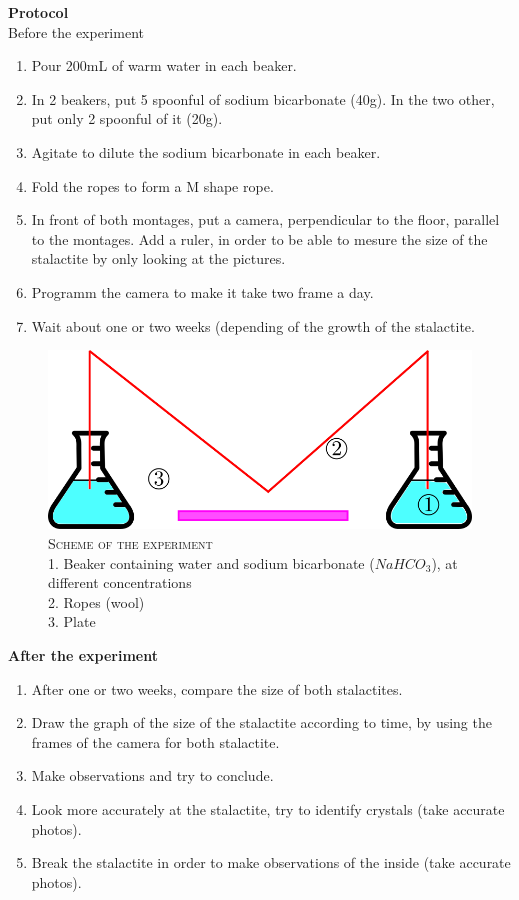 \documentclass[draft, final]{report}
\begin{document}
\textbf{Protocol} \\
Before the experiment
    \begin{enumerate}
      \item Pour 200mL of warm water in each beaker.
      \item In 2 beakers, put 5 spoonful of sodium bicarbonate (40g). In the two other, put only 2 spoonful of it (20g).
      \item Agitate to dilute the sodium bicarbonate in each beaker.
      \item Fold the ropes to form a M shape rope.
      \item In front of both montages, put a camera, perpendicular to the floor, parallel to the montages. Add a ruler, in order to be able to mesure the size of the stalactite by only looking at the pictures.
      \item Programm the camera to make it take two frame a day.
      \item Wait about one or two weeks (depending of the growth of the stalactite.
    \end{enumerate}

    \begin{figure}[!ht]
      \centering
      \includegraphics[scale=0.3]{LateX/Images/schemeexperiment.png}
      \caption{ \textsc{Scheme of the experiment}\\
                1. Beaker containing water and sodium bicarbonate ($NaHCO_3$), at different concentrations\\
                2. Ropes (wool)\\
                3. Plate\\}
    \end{figure}
\break
\textbf{After the experiment}
\begin{enumerate}
  \item After one or two weeks, compare the size of both stalactites.
  \item Draw the graph of the size of the stalactite according to time, by using the frames of the camera for both stalactite.
  \item Make observations and try to conclude.
  \item Look more accurately at the stalactite, try to identify crystals (take accurate photos).
  \item Break the stalactite in order to make observations of the inside (take accurate photos).
\end{enumerate}
\end{document}
